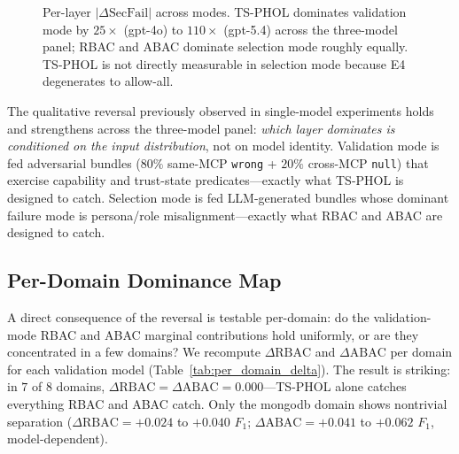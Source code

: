 \documentclass[10pt,a4paper,twocolumn]{article}
\begin{document}
\begin{figure}[!t]
\centering
{}
\caption{Per-layer $|\Delta\mathrm{SecFail}|$ across modes. TS-PHOL dominates validation mode by $25\times$ (gpt-4o) to $110\times$ (gpt-5.4) across the three-model panel; RBAC and ABAC dominate selection mode roughly equally. TS-PHOL is not directly measurable in selection mode because E4 degenerates to allow-all.}
\label{fig:reversal}
\end{figure}

The qualitative reversal previously observed in single-model experiments holds and strengthens across the three-model panel: \emph{which layer dominates is conditioned on the input distribution}, not on model identity. Validation mode is fed adversarial bundles ($80\%$ same-MCP \texttt{wrong} + $20\%$ cross-MCP \texttt{null}) that exercise capability and trust-state predicates---exactly what TS-PHOL is designed to catch. Selection mode is fed LLM-generated bundles whose dominant failure mode is persona/role misalignment---exactly what RBAC and ABAC are designed to catch.

\subsection{Per-Domain Dominance Map}
\label{sec:per_domain}

A direct consequence of the reversal is testable per-domain: do the validation-mode RBAC and ABAC marginal contributions hold uniformly, or are they concentrated in a few domains? We recompute $\Delta\mathrm{RBAC}$ and $\Delta\mathrm{ABAC}$ per domain for each validation model (Table~\ref{tab:per_domain_delta}). The result is striking: in $7$ of $8$ domains, $\Delta\mathrm{RBAC} = \Delta\mathrm{ABAC} = 0.000$---TS-PHOL alone catches everything RBAC and ABAC catch. Only the mongodb domain shows nontrivial separation ($\Delta\mathrm{RBAC} = +0.024$ to $+0.040$ $F_1$; $\Delta\mathrm{ABAC} = +0.041$ to $+0.062$ $F_1$, model-dependent).
\end{document}
